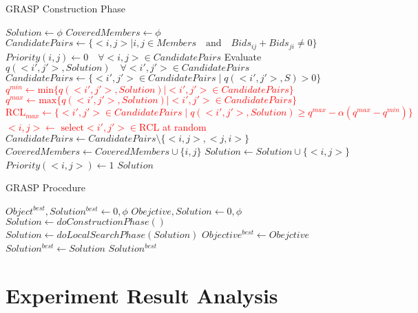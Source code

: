 \documentclass{article}
\begin{document}
\begin{algorithm}[H]
\renewcommand{\thealgorithm}{}
\caption{GRASP Construction Phase}
\begin{algorithmic}

\State $Solution \gets \phi$
\State $CoveredMembers \gets \phi$
\State $CandidatePairs \gets \{<i,j> \mid i,j \in Members \quad \textrm{and} \quad Bids_{ij} + Bids_{ji} \neq 0\}$
\State $Priority(i,j) \gets 0 \quad \forall <i,j> \in CandidatePairs$
    \State Evaluate $q(<i',j'>, Solution) \quad \forall <i',j'> \in CandidatePairs$
    \State $CandidatePairs \gets \{<i',j'> \in CandidatePairs \mid q(<i',j'>,S) > 0\}$
    \State \textcolor{red}{$q^{min} \gets \textrm{min}\{q(<i',j'>,Solution) \mid <i',j'> \in CandidatePairs\}$} 
    \State \textcolor{red}{$q^{max} \gets \textrm{max}\{q(<i',j'>,Solution) \mid <i',j'> \in CandidatePairs\}$}
    \State \textcolor{red}{$\textrm{RCL}_{max} \gets \{<i',j'> \in CandidatePairs \mid q(<i',j'>, Solution) \geq q^{max} - \alpha(q^{max} - q^{min}) \}$}
    \State \textcolor{red}{$<i,j> \gets \textrm{ select} <i',j'> \in \textrm{RCL}$ at random}
    \State $CandidatePairs \gets CandidatePairs \setminus \{<i,j>, <j,i>\}$
    \State $CoveredMembers \gets CoveredMembers \cup \{i,j\}$
    \State $Solution \gets Solution \cup \{<i,j>\}$
    \State $Priority(<i,j>) \gets 1$
\EndWhile
\State \Return $Solution$

\end{algorithmic}
\end{algorithm}


\begin{algorithm}[H]
\renewcommand{\thealgorithm}{}
\caption{GRASP Procedure}
\begin{algorithmic}

\State $Object^{best}, Solution^{best} \gets 0, \phi$
\State $Obejctive, Solution \gets 0, \phi$
\State $Solution \gets doConstructionPhase()$
\State $Solution \gets doLocalSearchPhase(Solution)$
\State $Objective^{best} \gets Obejctive$
\State $Solution^{best} \gets Solution$
\EndIf
\EndFor
\State \Return $Solution^{best}$

\end{algorithmic}    
\end{algorithm}

\section{Experiment Result Analysis}
\end{document}
